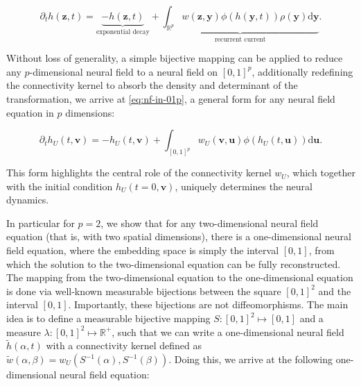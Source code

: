 \documentclass[NETN,manuscript]{stjour-new}
\def\R{\mathbb R}
\def\Rp{\R^p}
\renewcommand{\vec}[1]{\boldsymbol{#1}}
\begin{document}
\begin{equation} \label{eq:nf-in-rp}
\partial_t h(\vec z, t) = \underbrace{-h(\vec z, t)}_\text{exponential decay} + \underbrace{\int_{\mathbb{R}^p} w(\vec z, \vec y) \phi(h(\vec y, t)) \rho(\vec y) \mathrm d \vec y}_\text{recurrent current}.
\end{equation}

Without loss of generality, a simple bijective mapping can be applied to reduce any $p$-dimensional neural field to a neural field on $[0,1]^p$, additionally redefining the connectivity kernel to absorb the density and determinant of the transformation, we arrive at \autoref{eq:nf-in-01p}, a general form for any neural field equation in $p$ dimensions:


\begin{equation} \label{eq:nf-in-01p}
\partial_t h_U(t, \vec v) = -h_U(t, \vec v) + \int_{[0,1]^p} w_U(\vec v, \vec u) \phi(h_U(t, \vec u)) \mathrm d \vec u.
\end{equation}

This form highlights the central role of the connectivity kernel $w_U$, which together with the initial condition $h_U(t=0, \vec v)$, uniquely determines the neural dynamics.


In particular for $p=2$, we show that for any two-dimensional neural field equation (that is, with two spatial dimensions), there is a one-dimensional neural field equation, where the embedding space is simply the interval $[0,1]$, from which the solution to the two-dimensional equation can be fully reconstructed. The mapping from the two-dimensional equation to the one-dimensional equation is done via well-known measurable bijections between the square $[0,1]^2$ and the interval $[0,1]$. Importantly, these bijections are not diffeomorphisms.
The main idea is to define a measurable bijective mapping $S : [0,1]^2 \mapsto [0,1]$ and a measure $\lambda : [0,1]^2 \mapsto \mathbb{R}^+$, such that we can write a one-dimensional neural field	$\tilde h(\alpha, t)$ with a connectivity kernel defined as $\tilde w(\alpha, \beta) = w_U(S^{-1}(\alpha), S^{-1}(\beta))$. Doing this, we arrive at the following one-dimensional neural field equation: 
\end{document}
